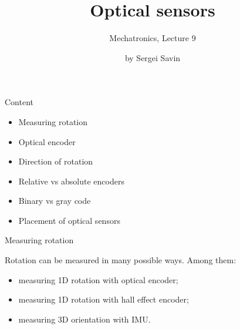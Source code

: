 \documentclass{beamer}
\title{Optical sensors}
\subtitle{Mechatronics, Lecture 9}
\author{by Sergei Savin}
\date{\mydate}
\begin{document}
\maketitle



\begin{frame}{Content}
\begin{itemize}
	\item Measuring rotation
	\item Optical encoder
	\item Direction of rotation
	\item Relative vs absolute encoders
	\item Binary vs gray code
	\item Placement of optical sensors
\end{itemize}
\end{frame}




\begin{frame}{Measuring rotation}
	\begin{flushleft}
		
		Rotation can be measured in many possible ways. Among them:
		
		\begin{itemize}
			\item measuring 1D rotation with optical encoder;
			\item measuring 1D rotation with hall effect encoder;
			\item measuring 3D orientation with IMU.
		\end{itemize}
		
		
	\end{flushleft}
\end{frame}
\end{document}
